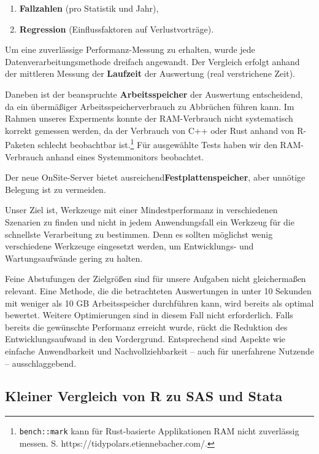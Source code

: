 \documentclass[
  german,
  10pt,
  twoside]{article}
\providecommand{\tightlist}{%
  \setlength{\itemsep}{0pt}\setlength{\parskip}{0pt}}
\let\oldtextbf\textbf
\renewcommand{\textbf}[1]{{\color{wistaBlue}\oldtextbf{#1}}}
\begin{document}
\begin{enumerate}
\def\labelenumi{\arabic{enumi}.}
\tightlist
\item
  \textbf{Fallzahlen} (pro Statistik und Jahr),
\item
  \textbf{Regression} (Einflussfaktoren auf Verlustvorträge).
\end{enumerate}

Um eine zuverlässige Performanz-Messung zu erhalten, wurde jede
Datenverarbeitungsmethode dreifach angewandt. Der Vergleich erfolgt
anhand der mittleren Messung der \textbf{Laufzeit} der Auswertung (real
verstrichene Zeit).

Daneben ist der beanspruchte \textbf{Arbeitsspeicher} der Auswertung
entscheidend, da ein übermäßiger Arbeitsspeicherverbrauch zu Abbrüchen
führen kann. Im Rahmen unseres Experments konnte der RAM-Verbrauch nicht
systematisch korrekt gemessen werden, da der Verbrauch von C++ oder Rust
anhand von R-Paketen schlecht beobachtbar ist.\footnote{\texttt{bench::mark}
  kann für Rust-basierte Applikationen RAM nicht zuverlässig messen. S.
  https://tidypolars.etiennebacher.com/.} Für ausgewählte Tests haben
wir den RAM-Verbrauch anhand eines Systemmonitors beobachtet.

Der neue OnSite-Server bietet ausreichend\textbf{Festplattenspeicher},
aber unnötige Belegung ist zu vermeiden.

Unser Ziel ist, Werkzeuge mit einer Mindestperformanz in verschiedenen
Szenarien zu finden und nicht in jedem Anwendungsfall ein Werkzeug für
die schnellste Verarbeitung zu bestimmen. Denn es sollten möglichst
wenig verschiedene Werkzeuge eingesetzt werden, um Entwicklungs- und
Wartungsaufwände gering zu halten.

Feine Abstufungen der Zielgrößen sind für unsere Aufgaben nicht
gleichermaßen relevant. Eine Methode, die die betrachteten Auswertungen
in unter 10 Sekunden mit weniger als 10 GB Arbeitsspeicher durchführen
kann, wird bereits als optimal bewertet. Weitere Optimierungen sind in
diesem Fall nicht erforderlich. Falls bereits die gewünschte Performanz
erreicht wurde, rückt die Reduktion des Entwicklungsaufwand in den
Vordergrund. Entsprechend sind Aspekte wie einfache Anwendbarkeit und
Nachvollziehbarkeit -- auch für unerfahrene Nutzende -- ausschlaggebend.

\subsection{Kleiner Vergleich von R zu SAS und
Stata}\label{kleiner-vergleich-von-r-zu-sas-und-stata}
\end{document}
